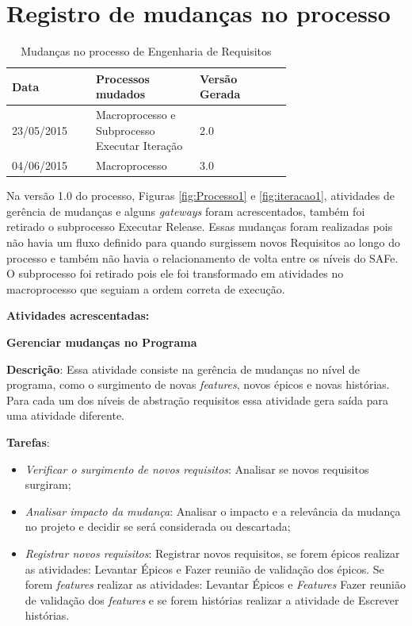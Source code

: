 \section{Registro de mudanças no processo}


\begin{table}[!h]
\centering
\caption{Mudanças no processo de Engenharia de Requisitos}
\label{Rotulo}
  \begin{tabular}{p{0.20\linewidth}p{0.25\linewidth}p{0.25\linewidth}}
  \hline
  Data  & Processos mudados & Versão Gerada\\
  \hline

  23/05/2015 & Macroprocesso e Subprocesso Executar Iteração & 2.0\\

  04/06/2015  & Macroprocesso & 3.0 \\

  \hline
  \end{tabular}
\end{table}

Na versão 1.0 do processo, Figuras \ref{fig:Processo1} e \ref{fig:iteracao1}, atividades de gerência de mudanças e alguns \textit{gateways} foram acrescentados, também foi retirado o subprocesso
  Executar Release. Essas mudanças foram realizadas pois não havia um fluxo definido para quando
  surgissem novos Requisitos ao longo do processo e também não havia o relacionamento de volta entre os níveis do SAFe. O subprocesso foi retirado
  pois ele foi transformado em atividades no macroprocesso que seguiam a ordem correta de execução.

\textbf{Atividades acrescentadas:}

\textbf{Gerenciar mudanças no Programa}

  \textbf{Descrição}: Essa atividade consiste na gerência de mudanças no nível de programa, como o surgimento de novas 
  \textit{features}, novos épicos e novas histórias. Para cada um dos níveis de abstração requisitos essa atividade gera saída
  para uma atividade diferente.

  \textbf{Tarefas}:
  \begin{itemize}
   \item \indent \textit{Verificar o surgimento de novos requisitos}: Analisar se novos requisitos surgiram;

   \item \indent \textit{Analisar impacto da mudança}: Analisar o impacto e a relevância da mudança no projeto e decidir se será considerada
   ou descartada;

   \item \indent \textit{Registrar novos requisitos}: Registrar novos requisitos, se forem épicos realizar as atividades: Levantar Épicos e 
   Fazer reunião de validação dos épicos. Se forem \textit{features} realizar as atividades: Levantar Épicos e \textit{Features}  
   Fazer reunião de validação dos \textit{features} e se forem histórias realizar a atividade de Escrever histórias.
  
  \end{itemize}

